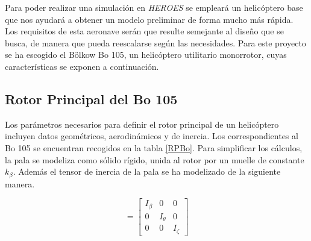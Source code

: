 Para poder realizar una simulación en \emph{HEROES} se empleará un helicóptero base que nos ayudará a obtener un modelo preliminar de forma mucho más rápida. Los requisitos de esta aeronave serán que resulte semejante al diseño que se busca, de manera que pueda reescalarse según las necesidades. Para este proyecto se ha escogido el Bölkow Bo 105, un helicóptero utilitario monorrotor, cuyas características se exponen a continuación.

\subsection{Rotor Principal del Bo 105}

Los parámetros necesarios para definir el rotor principal de un helicóptero incluyen datos geométricos, aerodinámicos y de inercia. Los correspondientes al Bo 105 se encuentran recogidos en la tabla \ref{RPBo}.
Para simplificar los cálculos, la pala se modeliza como sólido rígido, unida al rotor por un muelle de constante $k_\beta$.
Además el tensor de inercia de la pala se ha modelizado de la siguiente manera.

\begin{equation}
[I_B]=\left[	
\begin{array}{ccc}
I_\beta & 0 & 0\\
0 & I_\theta & 0\\
0 & 0 & I_\zeta
\end{array}
\right]
\end{equation}

